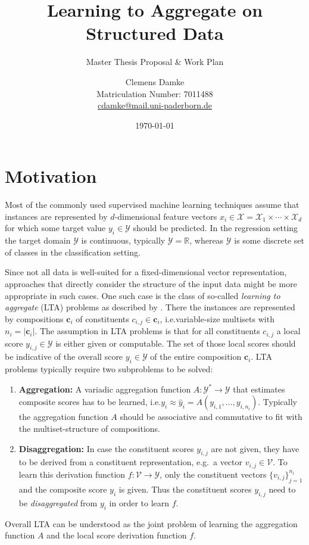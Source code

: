 \documentclass[12pt]{scrartcl}
\makeatletter
\newcommand{\thesisTitle}{Learning to Aggregate on Structured Data}
\newcommand{\thesisSubject}{Master Thesis Proposal \& Work Plan}
\newcommand{\thesisName}{Clemens Damke}
\newcommand{\thesisMail}{cdamke@mail.uni-paderborn.de}
\newcommand{\thesisMatNr}{7011488}
\makeatother
\begin{document}
\title{\thesisTitle}
\subtitle{\thesisSubject}
\author{{\thesisName}\\\small{Matriculation Number: \thesisMatNr}\\\small{\href{mailto:\thesisMail}{\thesisMail}}}
\date{\today}
\maketitle

\section{Motivation}%
\label{sec:motivation}

Most of the commonly used supervised machine learning techniques assume that instances are represented by $d$-dimensional feature vectors $x_i \in \mathcal{X} = \mathcal{X}_1 \times \cdots \times \mathcal{X}_d$ for which some target value $y_i \in \mathcal{Y}$ should be predicted.
In the regression setting the target domain $\mathcal{Y}$ is continuous, typically $\mathcal{Y} = \mathbb{R}$, whereas $\mathcal{Y}$ is some discrete set of classes in the classification setting.

Since not all data is well-suited for a fixed-dimensional vector representation, approaches that directly consider the structure of the input data might be more appropriate in such cases.
One such case is the class of so-called \textit{learning to aggregate} (LTA) problems as described by \citet{Melnikov2016}.
There the instances are represented by compositions $\bm{c}_i$ of constituents $c_{i,j} \in \bm{c}_i$, i.e.\@ variable-size multisets with $n_i = |\bm{c}_i|$.
The assumption in LTA problems is that for all constituents $c_{i,j}$ a local score $y_{i,j} \in \mathcal{Y}$ is either given or computable.
The set of those local scores should be indicative of the overall score $y_i \in \mathcal{Y}$ of the entire composition $\bm{c}_i$.
LTA problems typically require two subproblems to be solved:
\begin{enumerate}[label=\textbf{\arabic*.}]
	\item \textbf{Aggregation:}
		A variadic aggregation function $A: \mathcal{Y}^{*} \to \mathcal{Y}$ that estimates composite scores has to be learned, i.e.\@ $y_i \approx \hat{y}_i = A(y_{i,1}, \dots, y_{i,n_i})$.
		Typically the aggregation function $A$ should be associative and commutative to fit with the multiset-structure of compositions.
	\item \textbf{Disaggregation:}
		In case the constituent scores $y_{i,j}$ are not given, they have to be derived from a constituent representation, e.g.\ a vector $v_{i,j} \in \mathcal{V}$.
		To learn this derivation function $f: \mathcal{V} \to \mathcal{Y}$, only the constituent vectors ${\{v_{i,j}\}}_{j = 1}^{n_i}$ and the composite score $y_i$ is given.
		Thus the constituent scores $y_{i,j}$ need to be \textit{disaggregated} from $y_i$ in order to learn $f$.
\end{enumerate}
Overall LTA can be understood as the joint problem of learning the aggregation function $A$ and the local score derivation function $f$.
\end{document}
